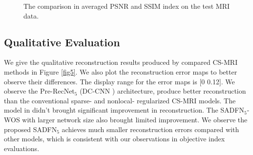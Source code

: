 \documentclass[runningheads]{llncs}
\begin{document}
\begin{figure}
\begin{center}
   \caption{The comparison in averaged PSNR and SSIM index on the test MRI data.}
\label{fig4}
\end{center}
\end{figure}

\subsection{Qualitative Evaluation}

We give the qualitative reconstruction results produced by compared CS-MRI methods in Figure \ref{fig5}. We also plot the reconstruction error maps to better observe their differences. The display range for the error maps is [0 0.12]. We observe the Pre-RecNet$_5$ (DC-CNN \cite{4}) architecture, produce better reconstruction than the conventional sparse- and nonlocal- regularized CS-MRI models. The model in \cite{27} didn't brought significant improvement in reconstruction. The SADFN$_5$-WOS with larger network size also brought limited improvement. We observe the proposed SADFN$_5$ achieves much smaller reconstruction errors compared with other models, which is consistent with our observations in objective index evaluations.
\end{document}
